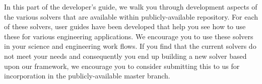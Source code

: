 
In this part of the developer's guide, we walk you through development
aspects of the various solvers that are available within
publicly-available \nek repository.  For each of these solvers, user
guides have been developed that help you see how to use these for
various engineering applications.  We encourage you to use these
solvers in your science and engineering work flows.  If you find that
the current solvers do not meet your needs and consequently you end up
building a new solver based upon our framework, we encourage you to
consider submitting this to us for incorporation in the
publicly-available master branch.






